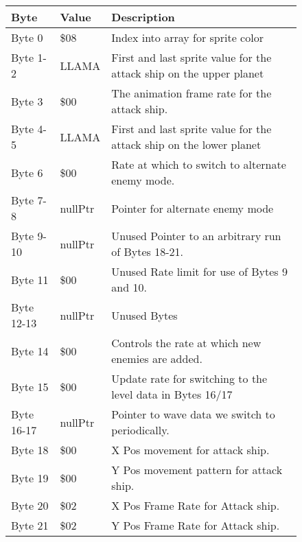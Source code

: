 \begin{figure}[H]
{\begin{adjustbox}{width=12cm}
\begin{tabular}{lll}
\toprule
 Byte       & Value                      & Description                                                         \\
\midrule
 Byte 0     & \$08                        & Index into array for sprite color                                   \\
 Byte 1-2   & LLAMA                      & First and last sprite value for the attack ship on the upper planet \\
 Byte 3     & \$00                        & The animation frame rate for the attack ship.                       \\
 Byte 4-5   & LLAMA                      & First and last sprite value for the attack ship on the lower planet \\
 Byte 6     & \$00                        & Rate at which to switch to alternate enemy mode.                    \\
 Byte 7-8   & nullPtr                    & Pointer for alternate enemy mode                                    \\
 Byte 9-10  & nullPtr                    & Unused Pointer to an arbitrary run of Bytes 18-21.                  \\
 Byte 11    & \$00                        & Unused Rate limit for use of Bytes 9 and 10.                        \\
 Byte 12-13 & nullPtr                    & Unused Bytes                                                        \\
 Byte 14    & \$00                        & Controls the rate at which new enemies are added.                   \\
 Byte 15    & \$00                        & Update rate for switching to the level data in Bytes 16/17          \\
 Byte 16-17 & nullPtr                    & Pointer to wave data we switch to periodically.                     \\
 Byte 18    & \$00                        & X Pos movement for attack ship.                                     \\
 Byte 19    & \$00                        & Y Pos movement pattern for attack ship.                             \\
 Byte 20    & \$02                        & X Pos Frame Rate for Attack ship.                                   \\
 Byte 21    & \$02                        & Y Pos Frame Rate for Attack ship.                                   \\

\end{tabular}
\end{adjustbox}}
\end{figure}
